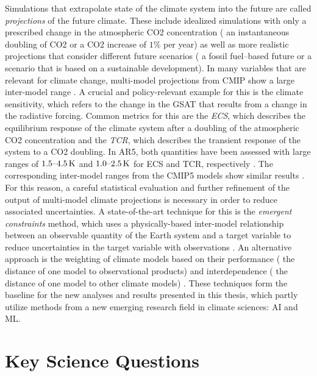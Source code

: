 Simulations that extrapolate state of the climate system into the future are
called \emph{projections} of the future climate. These include idealized
simulations with only a prescribed change in the atmospheric \ac{CO2}
concentration (\eg{} an instantaneous doubling of \ac{CO2} or a \ac{CO2}
increase of $1 \unit{\%}$ per year) as well as more realistic projections that
consider different future scenarios (\eg{} a fossil fuel--based future or a
scenario that is based on a sustainable development). In many variables that
are relevant for climate change, multi-model projections from \ac{CMIP} show a
large inter-model range \autocite{Collins2013, Flato2013}. A crucial and
policy-relevant example for this is the climate sensitivity, which refers to
the change in the \ac{GSAT} that results from a change in the radiative
forcing. Common metrics for this are the \emph{\ac{ECS}}, which describes the
equilibrium response of the climate system after a doubling of the atmospheric
\ac{CO2} concentration and the \emph{\ac{TCR}}, which describes the transient
response of the system to a \ac{CO2} doubling. In \acs{AR}5, both quantities
have been assessed with large ranges of $\rangeunit{1.5}{4.5}{K}$ and
$\rangeunit{1.0}{2.5}{K}$ for \ac{ECS} and \ac{TCR}, respectively
\autocite{Stocker2013}. The corresponding inter-model ranges from the
\acs{CMIP}5 models show similar results \autocite{Flato2013}. For this reason,
a careful statistical evaluation and further refinement of the output of
multi-model climate projections is necessary in order to reduce associated
uncertainties. A state-of-the-art technique for this is the \emph{emergent
  constraints} method, which uses a physically-based inter-model relationship
between an observable quantity of the Earth system and a target variable to
reduce uncertainties in the target variable with observations
\autocite{Allen2002}. An alternative approach is the weighting of climate
models based on their performance (\ie{} the distance of one model to
observational products) and interdependence (\ie{} the distance of one model to
other climate models) \autocite{Knutti2017a}. These techniques form the
baseline for the new analyses and results presented in this thesis, which
partly utilize methods from a new emerging research field in climate sciences:
\ac{AI} and \ac{ML}.


\section{Key Science Questions}
\label{sec:01:key_science_questions}

